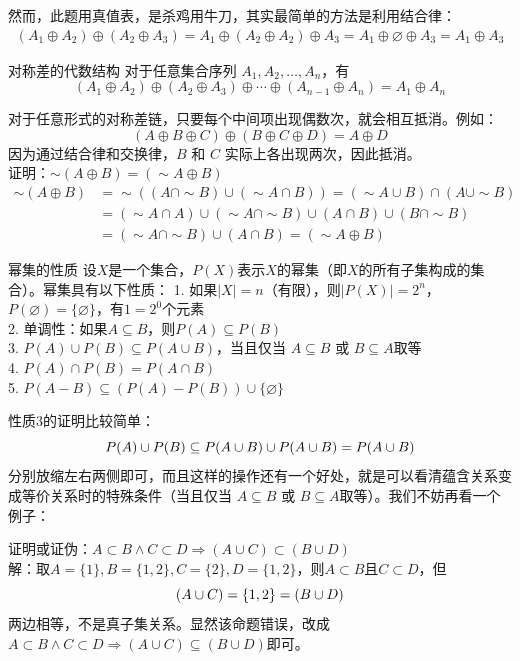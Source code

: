 然而，此题用真值表，是杀鸡用牛刀，其实最简单的方法是利用结合律：
\begin{align*}
(A_1 \oplus A_2) \oplus (A_2 \oplus A_3) = A_1 \oplus (A_2 \oplus A_2) \oplus A_3 = A_1 \oplus \varnothing \oplus A_3  = A_1 \oplus A_3 
\end{align*}
\begin{theorem}{对称差的代数结构}{}
    对于任意集合序列 $A_1, A_2, \ldots, A_n$，有\vspace{-10pt}
$$(A_1 \oplus A_2) \oplus (A_2 \oplus A_3) \oplus \cdots \oplus (A_{n-1} \oplus A_n) = A_1 \oplus A_n$$
\end{theorem}
对于任意形式的对称差链，只要每个中间项出现偶数次，就会相互抵消。例如：
$$(A \oplus B \oplus C) \oplus (B \oplus C \oplus D) = A \oplus D$$
因为通过结合律和交换律，$B$ 和 $C$ 实际上各出现两次，因此抵消。\\
证明：$\sim(A \oplus B) = (\sim A \oplus B)$
\begin{align*}
      \sim(A \oplus B) &= \sim((A\cap \sim B) \cup (\sim A \cap B))=(\sim A\cup B)\cap (A\cup \sim B) \\
      &=(\sim A\cap A)\cup(\sim A\cap\sim B)\cup(A\cap B)\cup(B\cap\sim B)\\
      &=(\sim A\cap\sim B)\cup(A\cap B)= (\sim A \oplus B)
\end{align*}
\begin{theorem}{幂集的性质}{}
设$X$是一个集合，$P(X)$表示$X$的幂集（即$X$的所有子集构成的集合）。幂集具有以下性质：
1. 如果$|X| = n$（有限），则$|P(X)| = 2^n$，$P(\varnothing) = \{\varnothing\}$，有$1 = 2^0$个元素\\
2. 单调性：如果$A \subseteq B$，则$P(A) \subseteq P(B)$\\
3. $P(A) \cup P(B) \subseteq P(A \cup B)$，当且仅当 $A \subseteq B$ 或 $B \subseteq A$取等\\
4. $P(A) \cap P(B) = P(A \cap B)$\\
5. $ P(A - B) \subseteq (P(A) - P(B))\cup\{\varnothing\}$
\end{theorem}
性质3的证明比较简单：\vspace{-10pt}
\[P(A) \cup P(B) \subseteq P(A \cup B)\cup P(A\cup B)=P(A\cup B)\vspace{-10pt}\]
分别放缩左右两侧即可，而且这样的操作还有一个好处，就是可以看清蕴含关系变成等价关系时的特殊条件（当且仅当 $A \subseteq B$ 或 $B \subseteq A$取等）。我们不妨再看一个例子：

证明或证伪：$A\subset B\land C\subset D\Rightarrow (A\cup C)\subset (B\cup D)$\\
解：取$A=\{1\},B=\{1,2\},C=\{2\},D=\{1,2\}$，则$A\subset B$且$C\subset D$，但
\vspace{-10pt}\[(A\cup C)=\{1,2\}=(B\cup D)\vspace{-10pt}\]
两边相等，不是真子集关系。显然该命题错误，改成$A\subset B\land C\subset D\Rightarrow (A\cup C)\subseteq (B\cup D)$即可。


